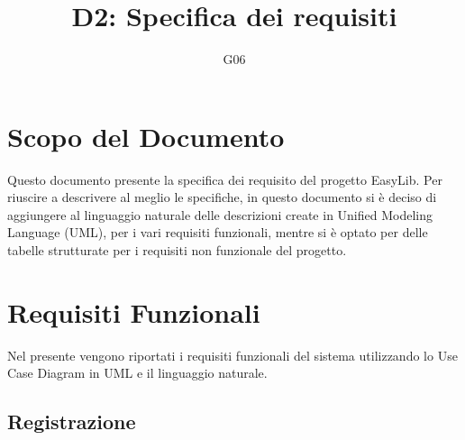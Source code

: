 \documentclass{article}
\title{D2: Specifica dei requisiti}
\author{G06}
\begin{document}
\maketitle
\tableofcontents
\newpage

\section{Scopo del Documento}
Questo documento presente la specifica dei requisito del progetto EasyLib. Per riuscire a descrivere al meglio le specifiche, in questo documento si è deciso di aggiungere al linguaggio naturale delle descrizioni create in Unified Modeling Language (UML), per i vari requisiti funzionali, mentre si è optato per delle tabelle strutturate per i requisiti non funzionale del progetto.

\section{Requisiti Funzionali}
Nel presente vengono riportati i requisiti funzionali del sistema utilizzando lo Use Case Diagram in UML e il linguaggio naturale.

\subsection{Registrazione}
\end{document}
